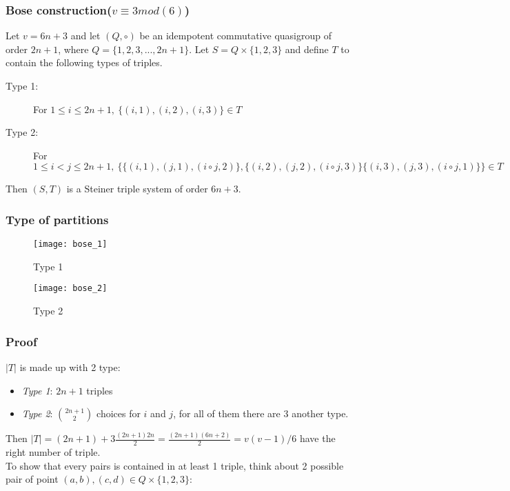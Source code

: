 \begin{frame}
\frametitle{Bose construction($v \equiv 3 mod(6)$)} 
Let $v = 6n +3$ and let $(Q,\circ)$ be an idempotent commutative quasigroup of order $2n+1$, where $Q = \{1,2,3,...,2n+1\}$. Let $S= Q \times \{1,2,3\}$ and define $T$ to contain the following types of triples.
\begin{description}
	\item[Type 1:] For $1 \le i \le 2n +1, \ \{(i,1),(i,2),(i,3)\} \in T$ 
	\item[Type 2:] For $1 \le i < j \le 2n +1, \ \{ \{ (i,1),(j,1),(i \circ j,2)\},\{ (i,2),(j,2),(i \circ j,3)\}\{ (i,3),(j,3),(i \circ j,1)\}\} \in T$
\end{description}

Then $(S,T)$ is a Steiner triple system of order $6n + 3$.

\end{frame}

\begin{frame}
\frametitle{Type of partitions}
\begin{figure}
	\texttt{[image: bose\_1]}
	\caption{Type 1}
\end{figure}
\begin{figure}
	\texttt{[image: bose\_2]}
	\caption{Type 2}
\end{figure}
\end{frame}


\begin{comment}
If we are considering a set of v(v-1)/6 triples of 
elements of a v-set and know that each pair elements is 
contained in at least one triple, then each pair must be 
contained in exactly one triple and we have an STS(v). 
Therefore we need only count the number of triples and verify 
that each pair of elements is contained in a triple in order to 
show that a system is an STS.
\end{comment}
\begin{frame}
\frametitle{Proof}
$|T|$ is made up with 2 type:
\begin{itemize}
	\item \textit{Type 1}: $2n+1$ triples
	\item \textit{Type 2}: $\binom{2n + 1}{2}$ choices for $i$ and $j$, for all of them there are 3 another type.
\end{itemize} 
Then $|T| = (2n+1) + 3\frac{(2n+1)2n}{2} = \frac{(2n+1)(6n+2)}{2} = v(v-1)/6$ have the right number of triple.\\%

To show that every pairs is contained in at least 1 triple, think about 2 possible pair of point $(a,b),(c,d) \in Q \times \{1,2,3\}$:
\end{frame}

